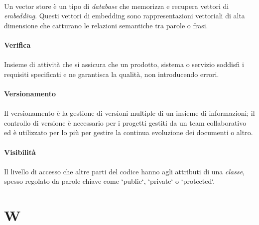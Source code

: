 \documentclass[10pt, a4paper]{article}
\begin{document}
\paragraph{}Un vector store è un tipo di \textit{database\pg} che memorizza e recupera vettori di \textit{embedding\pg}. Questi vettori di embedding sono rappresentazioni vettoriali di alta dimensione che catturano le relazioni semantiche tra parole o frasi.

\vspace{2em}
\paragraph{Verifica}\noindent\hrulefill
\paragraph{}Insieme di attività che si assicura che un prodotto, sistema o servizio soddisfi i requisiti specificati e ne garantisca la qualità, non introducendo errori.


\vspace{2em}
\paragraph{Versionamento}\noindent\hrulefill
\paragraph{}Il versionamento è la gestione di versioni multiple di un insieme di informazioni; il controllo di versione è necessario
per i progetti gestiti da un team collaborativo ed è utilizzato per lo più per gestire la continua evoluzione dei documenti o altro.

\vspace{2em}
\paragraph{Visibilità}\noindent\hrulefill
\paragraph{}Il livello di accesso che altre parti del codice hanno agli attributi di una \textit{classe\pg}, spesso regolato da parole chiave come `public`, `private` o `protected`.




\newpage
\section{W}
\end{document}
